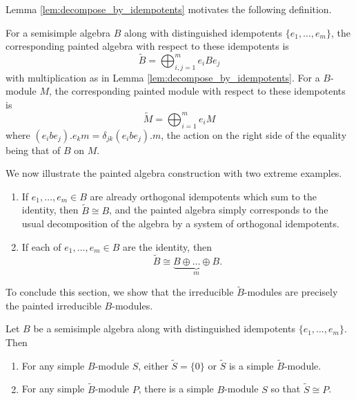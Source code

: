 \documentclass[ALCO,Unicode,published]{cedram}
\newcommand{\tB}{{\tilde{B}}}
\newcommand{\tS}{{\tilde{S}}}
\begin{document}
Lemma \ref{lem:decompose_by_idempotents} motivates the following definition.

\begin{defi}
For a semisimple algebra $B$ along with distinguished idempotents $\{e_1,\dots,e_m\}$, the corresponding painted algebra with respect to these idempotents is \[\tB=\bigoplus_{i,j=1}^m e_i B e_j\] with multiplication as in Lemma \ref{lem:decompose_by_idempotents}. For a $B$-module $M$, the corresponding painted module with respect to these idempotents is \[\tilde{M}=\bigoplus_{i=1}^m e_i M\]  where $(e_i b e_j).e_k m=\delta_{jk}(e_ibe_j).m$, the action on the right side of the equality being that of $B$ on $M$.
\end{defi}

\begin{exam} We now illustrate the painted algebra construction with two extreme examples.
    
    \begin{enumerate}[label={\alph*}]
        \item[(a)] If $e_1,\dots,e_m\in B$ are already orthogonal idempotents which sum to the identity, then $\tilde{B}\cong B$, and the painted algebra simply corresponds to the usual decomposition of the algebra by a system of orthogonal idempotents.
        \item[(b)] If each of $e_1,\dots,e_m\in B$ are the identity, then \[\tilde{B}\cong\underbrace{B\oplus\dots\oplus B}_{m}.\]
    \end{enumerate}

\end{exam}

To conclude this section, we show that the irreducible $\tB$-modules are precisely the painted irreducible $B$-modules.

\begin{lemma}\label{lem:symmetrized_modules}
    Let $B$ be a semisimple algebra along with distinguished idempotents $\{e_1,\dots,e_m\}$. Then \begin{enumerate}
        \item For any simple $B$-module $S$, either $\tS=\{0\}$ or $\tS$ is a simple $\tB$-module.
        \item For any simple $\tB$-module $P$, there is a simple $B$-module $S$ so that $\tS\cong P$.
    \end{enumerate}
\end{lemma}
\end{document}
